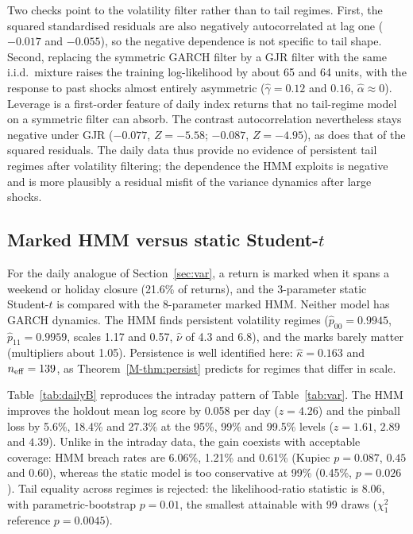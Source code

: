 \documentclass[11pt,a4paper]{article}
\theoremstyle{plain}
\theoremstyle{remark}
\begin{document}
Two checks point to the volatility filter rather than to tail regimes. First, the squared standardised residuals are also negatively autocorrelated at lag one ($-0.017$ and $-0.055$), so the negative dependence is not specific to tail shape. Second, replacing the symmetric GARCH filter by a GJR filter \citep{glosten1993} with the same i.i.d.\ mixture raises the training log-likelihood by about 65 and 64 units, with the response to past shocks almost entirely asymmetric ($\hat\gamma=0.12$ and $0.16$, $\hat\alpha\approx0$). Leverage is a first-order feature of daily index returns that no tail-regime model on a symmetric filter can absorb. The contrast autocorrelation nevertheless stays negative under GJR ($-0.077$, $Z=-5.58$; $-0.087$, $Z=-4.95$), as does that of the squared residuals. The daily data thus provide no evidence of persistent tail regimes after volatility filtering; the dependence the HMM exploits is negative and is more plausibly a residual misfit of the variance dynamics after large shocks.

\subsection{Marked HMM versus static Student-$t$}
For the daily analogue of Section~\ref{sec:var}, a return is marked when it spans a weekend or holiday closure (21.6\% of returns), and the 3-parameter static Student-$t$ is compared with the 8-parameter marked HMM. Neither model has GARCH dynamics. The HMM finds persistent volatility regimes ($\hat p_{00}=0.9945$, $\hat p_{11}=0.9959$, scales 1.17 and 0.57, $\hat\nu$ of 4.3 and 6.8), and the marks barely matter (multipliers about 1.05). Persistence is well identified here: $\hat\kappa=0.163$ and $n_{\rm eff}=139$, as Theorem~\ref{M-thm:persist} predicts for regimes that differ in scale.

Table~\ref{tab:dailyB} reproduces the intraday pattern of Table~\ref{tab:var}. The HMM improves the holdout mean log score by 0.058 per day ($z=4.26$) and the pinball loss by 5.6\%, 18.4\% and 27.3\% at the 95\%, 99\% and 99.5\% levels ($z=1.61$, $2.89$ and $4.39$). Unlike in the intraday data, the gain coexists with acceptable coverage: HMM breach rates are 6.06\%, 1.21\% and 0.61\% (Kupiec $p=0.087$, $0.45$ and $0.60$), whereas the static model is too conservative at 99\% (0.45\%, $p=0.026$). Tail equality across regimes is rejected: the likelihood-ratio statistic is 8.06, with parametric-bootstrap $p=0.01$, the smallest attainable with 99 draws ($\chi^2_1$ reference $p=0.0045$).
\end{document}
